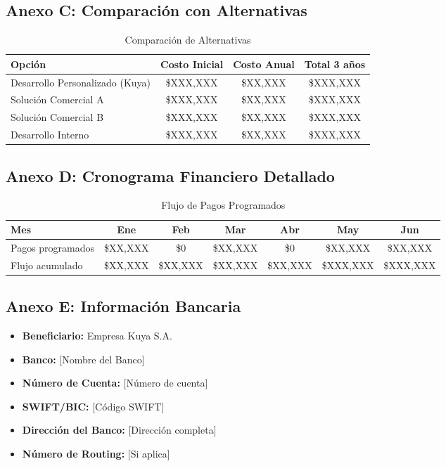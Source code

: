 \subsection{Anexo C: Comparación con Alternativas}
\begin{table}[h!]
\centering
\begin{tabular}{|l|c|c|c|}
\hline
\textbf{Opción} & \textbf{Costo Inicial} & \textbf{Costo Anual} & \textbf{Total 3 años} \\
\hline
Desarrollo Personalizado (Kuya) & \$XXX,XXX & \$XX,XXX & \$XXX,XXX \\
Solución Comercial A & \$XXX,XXX & \$XX,XXX & \$XXX,XXX \\
Solución Comercial B & \$XXX,XXX & \$XX,XXX & \$XXX,XXX \\
Desarrollo Interno & \$XXX,XXX & \$XX,XXX & \$XXX,XXX \\
\hline
\end{tabular}
\caption{Comparación de Alternativas}
\end{table}

\subsection{Anexo D: Cronograma Financiero Detallado}
\begin{table}[h!]
\centering
\begin{tabular}{|l|c|c|c|c|c|c|}
\hline
\textbf{Mes} & \textbf{Ene} & \textbf{Feb} & \textbf{Mar} & \textbf{Abr} & \textbf{May} & \textbf{Jun} \\
\hline
Pagos programados & \$XX,XXX & \$0 & \$XX,XXX & \$0 & \$XX,XXX & \$XX,XXX \\
Flujo acumulado & \$XX,XXX & \$XX,XXX & \$XX,XXX & \$XX,XXX & \$XXX,XXX & \$XXX,XXX \\
\hline
\end{tabular}
\caption{Flujo de Pagos Programados}
\end{table}

\subsection{Anexo E: Información Bancaria}
\begin{itemize}
    \item \textbf{Beneficiario:} Empresa Kuya S.A.
    \item \textbf{Banco:} [Nombre del Banco]
    \item \textbf{Número de Cuenta:} [Número de cuenta]
    \item \textbf{SWIFT/BIC:} [Código SWIFT]
    \item \textbf{Dirección del Banco:} [Dirección completa]
    \item \textbf{Número de Routing:} [Si aplica]
\end{itemize}

